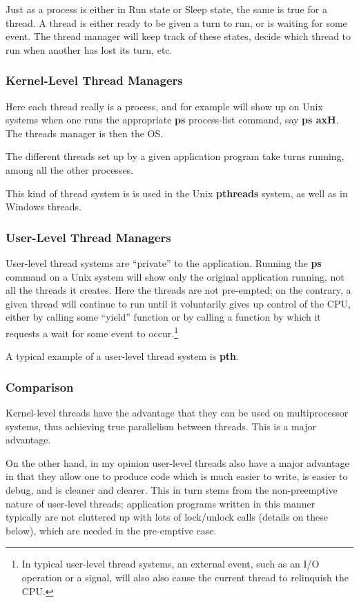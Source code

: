Just as a process is either in Run state or Sleep state, the same is
true for a thread.   A thread is either ready to be given a turn to run,
or is waiting for some event.  The thread manager will keep track of
these states, decide which thread to run when another has lost its turn,
etc.

\subsubsection{Kernel-Level Thread Managers}

Here each thread really is a process, and for example will show up
on Unix systems when one runs the appropriate {\bf ps} process-list
command, say {\bf ps axH}.  The threads manager is then the OS.  

The different threads set up by a given application program take turns
running, among all the other processes. 

This kind of thread system is is used in the Unix {\bf pthreads} system,
as well as in Windows threads.

\subsubsection{User-Level Thread Managers}
\label{user}

User-level thread systems are ``private'' to the application.  Running
the {\bf ps} command on a Unix system will show only the original
application running, not all the threads it creates.  Here the threads
are not pre-empted; on the contrary, a given thread will continue to run
until it voluntarily gives up control of the CPU, either by calling some
``yield'' function or by calling a function by which it requests a wait
for some event to occur.\footnote{In typical user-level thread systems,
an external event, such as an I/O operation or a signal, will also also
cause the current thread to relinquish the CPU.} 

A typical example of a user-level thread system is {\bf pth}.

\subsubsection{Comparison}

Kernel-level threads have the advantage that they can be used on
multiprocessor systems, thus achieving true parallelism between threads.
This is a major advantage.

On the other hand, in my opinion user-level threads also have a major
advantage in that they allow one to produce code which is much easier to
write, is easier to debug, and is cleaner and clearer.  This in turn
stems from the non-preemptive nature of user-level threads; application
programs written in this manner typically are not cluttered up with lots
of lock/unlock calls (details on these below), which are needed in the
pre-emptive case.

